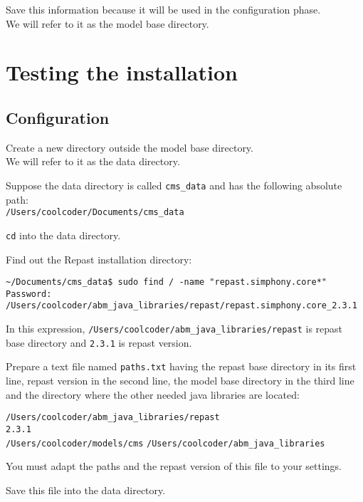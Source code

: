 \documentclass{article}
\begin{document}
Save this information because it will be used in the configuration phase. \\ We will refer to it as the model base directory.

\section{Testing the installation}

\subsection{Configuration}

Create a new directory outside the model base directory. \\ We will refer to it as the data directory.

Suppose the data directory is called \verb+cms_data+ and has the following absolute path: \\
\verb+/Users/coolcoder/Documents/cms_data+

\verb+cd+ into the data directory.

Find out the Repast installation directory:

\vskip2mm
\noindent\verb+~/Documents/cms_data$ +\color{red}\verb+sudo find / -name "repast.simphony.core*"+ \color{black}
\verb+Password:+ \\ \color{blue}
\verb+/Users/coolcoder/abm_java_libraries/repast/repast.simphony.core_2.3.1 +\\
\color{black}
\vskip2mm

In this expression, \verb+/Users/coolcoder/abm_java_libraries/repast+ is repast base directory and \verb+2.3.1+ is repast version.

Prepare a text file named \verb+paths.txt+ having the repast base directory in its first line, repast version in the second line, the model base directory in the third line and the directory where the other needed java libraries are located:

\color{magenta}
\vskip2mm \noindent
\verb+/Users/coolcoder/abm_java_libraries/repast+ \\
\verb+2.3.1+ \\
\verb+/Users/coolcoder/models/cms+
\verb+/Users/coolcoder/abm_java_libraries+ \\
\vskip2mm

\color{black}
You must adapt the paths and the repast version of this file to your settings.

Save this file into the data directory.
\end{document}
